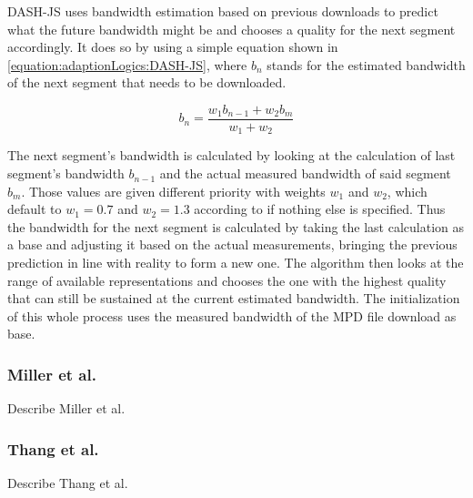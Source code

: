 DASH-JS \cite{RLMT12} uses bandwidth estimation based on previous downloads to predict what the future bandwidth might be and chooses a quality for the next segment accordingly. It does so by using a simple equation shown in \ref{equation:adaptionLogics:DASH-JS}, where $b_{n}$ stands for the estimated bandwidth of the next segment that needs to be downloaded.

\begin{equation}
b_{n} = \dfrac{w_{1}b_{n-1} + w_{2}b_{m}}{w_{1}+w_{2}}
\label{equation:adaptionLogics:DASH-JS}
\end{equation}

The next segment's bandwidth is calculated by looking at the calculation of last segment's bandwidth $b_{n-1}$ and the actual measured bandwidth of said segment $b_{m}$. Those values are given different priority with weights $w_{1}$ and $w_{2}$, which default to $w_{1}=0.7$ and $w_{2}=1.3$ according to \cite{RLMT12} if nothing else is specified. Thus the bandwidth for the next segment is calculated by taking the last calculation as a base and adjusting it based on the actual measurements, bringing the previous prediction in line with reality to form a new one. The algorithm then looks at the range of available representations and chooses the one with the highest quality that can still be sustained at the current estimated bandwidth. The initialization of this whole process uses the measured bandwidth of the MPD file download as base.
\subsubsection{Miller et al.}
Describe Miller et al. \cite{MQGW12b}

\subsubsection{Thang et al.}
Describe Thang et al. \cite{THKP12}

	

